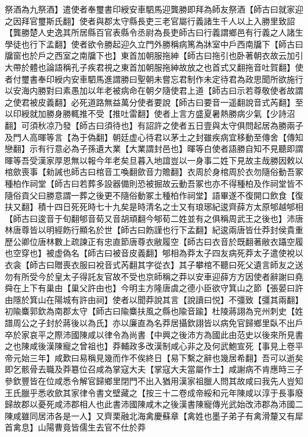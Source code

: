 祭酒為九祭酒】遣使者奉璽書印綬安車駟馬迎龔勝即拜為師友祭酒【師古曰就家迎之因拜官璽斯氏翻】使者與郡太守縣長吏三老官屬行義諸生千人以上入勝里致詔【龔勝楚人史逸其所居縣百官表縣令丞尉為長吏師古曰行義謂鄉邑有行義之人諸生學徒也行下孟翻】使者欲令勝起迎久立門外勝稱病篤為牀室中戶西南牖下【師古曰牖窗也於戶之西室之南牖下也】東首加朝服拖紳【師古曰拖引也卧著朝衣故云加引大帶於體也論語稱孔子疾君視之東首加朝服拖紳故放之也首式又翻拖音吐賀翻】使者付璽書奉印綬内安車駟馬進謂勝曰聖朝未嘗忘君制作未定待君為政思聞所欲施行以安海内勝對曰素愚加以年老被病命在朝夕隨使君上道【師古曰示若尊敬使者故謂之使君被皮義翻】必死道路無益萬分使者要說【師古曰要音一遥翻說音式芮翻】至以印綬就加勝身勝輒推不受【推吐雷翻】使者上言方盛夏暑熱勝病少氣【少詩沼翻】可須秋凉乃發【師古曰須待也】有詔許之使者五日壹與太守俱問起居為勝兩子及門人高暉等言【為于偽翻】朝廷虚心待君以茅土之封雖疾病宜移動至傳舍【傳知戀翻】示有行意必為子孫遺大業【大業謂封邑也】暉等白使者語勝自知不見聽即謂暉等吾受漢家厚恩無以報今年老矣旦暮入地誼豈以一身事二姓下見故主哉勝因敕以棺歛喪事【勑誡也師古曰棺音工喚翻歛音力贍翻】衣周於身棺周於衣勿隨俗動吾冢種柏作祠堂【師古曰若葬多設器備則恐被掘故云動吾冢也亦不得種柏及作祠堂皆不隨俗貢父曰勝意謂一葬之後更不隨俗動冢土種柏作祠堂】語畢遂不復開口飲食【復扶又翻】積十四日死死時七十九矣是時清名之士又有琅琊紀逡齊薛方太原郇越郇相【師古曰逡音于旬翻郇音荀又音胡頑翻今郇荀二姓並有之俱稱周武王之後也】沛唐林唐尊皆以明經飭行顯名於世【師古曰飭謹也行下孟翻】紀逡兩唐皆仕莽封侯貴重歷公卿位唐林數上疏諫正有忠直節唐尊衣敝履空【師古曰衣音於既翻著敝衣躡空履也空穿也】被虚偽名【師古曰被音皮義翻】郇相為莽太子四友病死莽太子遣使裞以衣衾【師古曰贈喪衣服曰裞音式芮翻其字從衣】其子攀棺不聽曰死父遺言師友之送勿有所受今於皇太子得託友官故不受也京師稱之莽以安車迎薛方方因使者辭謝曰堯舜在上下有巢由【巢父許由也】今明主方隆唐虞之德小臣欲守箕山之節【張晏曰許由隱於箕山在陽城有許由祠】使者以聞莽說其言【說讀曰悦】不彊致【彊其兩翻】初隃麋郭欽為南郡太守【師古曰隃麋扶風之縣也隃音踰】杜陵蔣詡為兖州刺史【姓譜周公之子封於蔣後以為氏】亦以廉直為名莽居攝欽詡皆以病免官歸鄉里臥不出戶卒於家哀平之際沛國陳咸以律令為尚書【中興之後沛方為國此由范史以後來所見書之也陳咸後漢陳寵之曾祖也】莽輔政多改漢制咸心非之及何武鮑宣死【事見上卷平帝元始三年】咸歎曰易稱見幾而作不俟終日【易下繫之辭也幾居希翻】吾可以逝矣即乞骸骨去職及莽簒位召咸為掌寇大夫【掌寇大夫當屬作士】咸謝病不肯應時三子參欽豐皆在位咸悉令解官歸鄉里閉門不出入猶用漢家祖臘人問其故咸曰我先人豈知王氏臘乎悉收歛其家律令書文壁藏之【按三十二卷成帝綏和元年陳咸以淳于長事廢歸故郡以憂死咸沛郡相人也此書沛國陳咸木之後漢書陳寵傳光武始改沛郡為沛國二陳咸雖同居沛各是一人】又齊栗融北海禽慶蘇章【禽姓也墨子弟子有禽滑釐又有犀首禽息】山陽曹竟皆儒生去官不仕於莽

